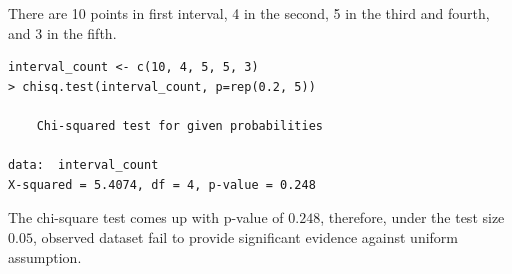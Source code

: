 \documentclass[11pt,letterpaper]{article}
\begin{document}
\noindent There are 10 points in first interval, 4 in the second, 5 in the third and fourth, and 3 in the fifth.

\begin{verbatim}
interval_count <- c(10, 4, 5, 5, 3)
> chisq.test(interval_count, p=rep(0.2, 5))

	Chi-squared test for given probabilities

data:  interval_count
X-squared = 5.4074, df = 4, p-value = 0.248
\end{verbatim}

\noindent The chi-square test comes up with p-value of $0.248$, therefore, under the test size $0.05$, observed dataset fail to provide significant evidence against uniform assumption. 
\end{document}
